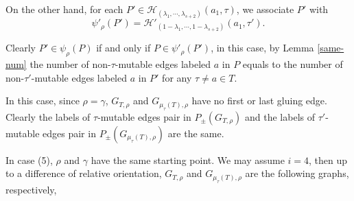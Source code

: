 \documentclass[10pt]{amsart}
\theoremstyle{theorems}
\begin{document}
On the other hand, for each $P'\in \mathcal H_{(\lambda_1,\cdots,\lambda_{s+2})}(a_1,\tau)$, we associate $P'$ with $$\psi'_{\rho}(P')=\mathcal H'_{(1-\lambda_1,\cdots,1-\lambda_{s+2})}(a_1,\tau').$$

Clearly $P'\in \psi_{\rho}(P)$ if and only if $P\in \psi'_{\rho}(P')$, in this case, by Lemma \ref{same-num} the number of non-$\tau$-mutable edges labeled $a$ in $P$ equals to the number of non-$\tau'$-mutable edges labeled $a$ in $P'$ for any $\tau \neq a\in T$.

\medskip

In this case, since $\rho=\gamma$, $G_{T,\rho}$ and $G_{\mu_{\tau}(T),\rho}$ have no first or last gluing edge. Clearly the labels of $\tau$-mutable edges pair in $P_{\pm}(G_{T,\rho})$ and the labels of $\tau'$-mutable edges pair in $P_{\pm}(G_{\mu_{\tau}(T),\rho})$ are the same.


\medskip

In case (5), $\rho$ and $\gamma$ have the same starting point. We may assume $i=4$, then up to a difference of relative orientation, $G_{T,\rho}$ and $G_{\mu_{\tau}(T),\rho}$ are the following graphs, respectively,
\end{document}
